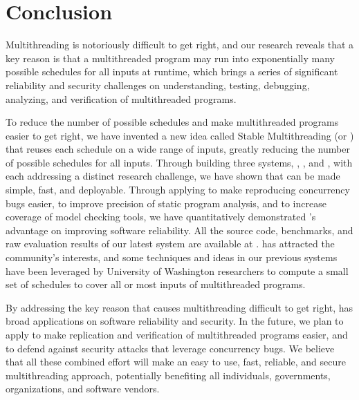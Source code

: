 \chapter{Conclusion} \label{sec:conclusion}

Multithreading is notoriously difficult to get right, and our research reveals
that a key reason is that a multithreaded program may run into exponentially 
many
possible schedules for all inputs at runtime, which brings a series of
significant reliability and security challenges on understanding,
testing, debugging, analyzing, and verification of multithreaded
programs.

To reduce the number of possible schedules and make multithreaded
programs easier to get right, we have invented a new idea called Stable
Multithreading (or \smt) that reuses each schedule on a wide range of inputs,
greatly reducing the number of possible schedules for all inputs. Through
building three \smt systems, \tern, \peregrine, and \parrot, with each 
addressing
a distinct research challenge, we have shown that \smt can be made simple, fast,
and deployable. Through applying \smt to make reproducing concurrency bugs
easier, to improve precision of static program analysis, and to increase
coverage of model checking tools, we have quantitatively demonstrated \smt's 
advantage on improving software reliability. All the source code,
benchmarks, and raw evaluation results of our latest \smt system \parrot are
available at \github. \smt has attracted the community's interests, and some 
techniques and ideas in our previous systems have been leveraged by 
University of Washington researchers to compute a small set of schedules to 
cover all or most inputs of multithreaded programs.

By addressing the key reason that causes multithreading difficult to get right,
\smt has broad applications on software reliability and security. In the 
future, we plan to apply \smt to make replication and verification of 
multithreaded programs easier, and to defend against security attacks 
that leverage concurrency bugs. We believe that all these combined effort will 
make \smt an easy to use, fast, reliable, and secure multithreading approach, 
potentially benefiting all individuals, governments, organizations, and 
software 
vendors. 